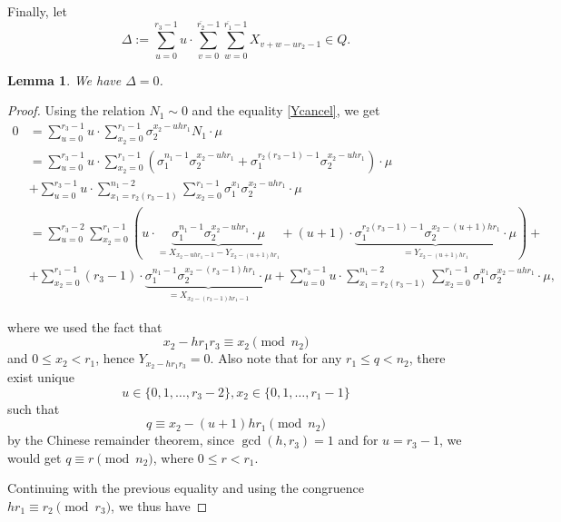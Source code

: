 \documentclass[12pt,a4paper]{article}
\newtheorem{lemma}[theorem]{Lemma}
\theoremstyle{definition}
\newcommand{\uo}{\overline{r_2}}
\newcommand{\vo}{\overline{r_1}}
\begin{document}
Finally, let $$\Delta:=\sum_{u=0}^{r_3-1}u\cdot\sum_{v=0}^{\uo-1} \sum _{w=0}^{\vo-1} X_{v+w-ur_2-1}\in Q.$$

\begin{lemma}
We have $\Delta=0$.
\end{lemma}
\begin{proof}
Using the relation $N_1\sim 0$ and the equality \eqref{Ycancel},
we get
\begin{align*}
0&= \sum_{u=0}^{r_3-1}u\cdot \sum _{x_2=0}^{r_1-1}\sigma_2^{x_2-uh r_1}N_1\cdot \mu\\
&=\sum_{u=0}^{r_3-1}u\cdot \sum _{x_2=0}^{r_1-1} \left( \sigma_1^{n_1-1}\sigma_2^{x_2-uh r_1}+\sigma_1^{r_2(r_3-1)-1}\sigma_2^{x_2-uh r_1}\right)\cdot \mu\\
&+\sum_{u=0}^{r_3-1}u\cdot \sum_{x_1=r_2(r_3-1)}^{n_1-2}\sum _{x_2=0}^{r_1-1}\sigma_1^{x_1}\sigma_2^{x_2-uh r_1}\cdot \mu\\
&=\sum_{u=0}^{r_3-2} \sum _{x_2=0}^{r_1-1} \left( u\cdot\underbrace{\sigma_1^{n_1-1}\sigma_2^{x_2-uh r_1}\cdot \mu}_{=X_{x_2-uhr_1-1}-Y_{x_2-(u+1)hr_1}}+(u+1)\cdot\underbrace{\sigma_1^{r_2(r_3-1)-1}\sigma_2^{x_2-(u+1)h r_1}\cdot \mu}_{=Y_{x_2-(u+1)h r_1}}\right)+\\
&+\sum_{x_2=0}^{r_1-1}(r_3-1)\cdot \underbrace{\sigma_1^{n_1-1}\sigma_2^{x_2-(r_3-1)h r_1}\cdot \mu}_{=
X_{x_2-(r_3-1)hr_1-1}}+\sum_{u=0}^{r_3-1}u\cdot \sum_{x_1=r_2(r_3-1)}^{n_1-2}\sum _{x_2=0}^{r_1-1}\sigma_1^{x_1}\sigma_2^{x_2-uh r_1}\cdot \mu,
\end{align*}

where we used the fact that $$x_2-hr_1r_3\equiv x_2\pmod{n_2}$$  and $0\leq x_2< r_1$, hence $Y_{x_2-hr_1r_3}=0$. Also note that for any $r_1\leq q<n_2$, there exist unique $$u\in\{0,1,\dots,r_3-2\},x_2\in\{0,1,\dots,r_1-1\}$$ such that $$q\equiv x_2-(u+1)hr_1 \pmod{n_2}$$ by the Chinese remainder theorem, since $\gcd(h,r_3)=1$ and for $u=r_3-1$, we would get  $q\equiv r\pmod{n_2}$, where $0\leq r<r_1$.

Continuing with the previous equality and using the congruence $hr_1\equiv r_2\pmod{r_3}$, we thus have


\end{proof}
\end{document}
